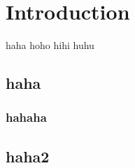 

\chapter{Introduction}

haha \citep{Doerrer87:ELS} hoho \citep[dfdf]{Rodler01:EEF} hihi \citep{Hallinan99:DOM} huhu \citep{Bamford96:AWI}

\citep{Papanicolaou42:ANP}

\section{haha}

\subsection{hahaha}

\section{haha2}

